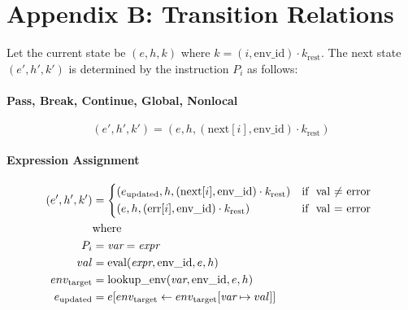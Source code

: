 \documentclass[runningheads]{llncs}
\newcommand{\lit}[1]{\textit{#1}}
\newcommand{\state}[3]{(#1, #2, #3)} %
\newcommand{\context}[2]{(#1, #2)} %
\newcommand{\lookupenv}{\text{lookup\_env}}
\newcommand{\evalexpr}{\text{eval}}
\begin{document}
\section*{Appendix B: Transition Relations}

Let the current state be $\state{e}{h}{k}$ where $k = \context{i}{\text{env\_id}} \cdot k_{\text{rest}}$. The next state $\state{e'}{h'}{k'}$ is determined by the instruction $P_i$ as follows:

\paragraph{Pass, Break, Continue, Global, Nonlocal}
\[ \state{e'}{h'}{k'} = \state{e}{h}{\context{\text{next}[i]}{\text{env\_id}} \cdot k_{\text{rest}}} \]

\paragraph{Expression Assignment}
\begin{displaymath}
	\begin{aligned}
		\state{e'}{h'}{k'}  & =
		\begin{cases*}
			\state{e_{\text{updated}}}{h}{\context{\text{next}[i]}{\text{env\_id}} \cdot k_{\text{rest}}} & \text{if } val $\neq$ error \\
			\state{e}{h}{\context{\text{err}[i]}{\text{env\_id}} \cdot k_{\text{rest}}}                   & \text{if } val = error
		\end{cases*}
		\\
		                    & \text{where}
		\\
		P_{i}               & = \lit{var} = \lit{expr}                                                       \\
		val                 & = \evalexpr(\lit{expr}, \text{env\_id}, e, h)                                  \\
		env_{\text{target}} & = \lookupenv(\lit{var}, \text{env\_id}, e, h)                                  \\
		e_{\text{updated}}  & = e[env_{\text{target}} \leftarrow env_{\text{target}}[\lit{var} \mapsto val]] \\
	\end{aligned}
\end{displaymath}
\end{document}

